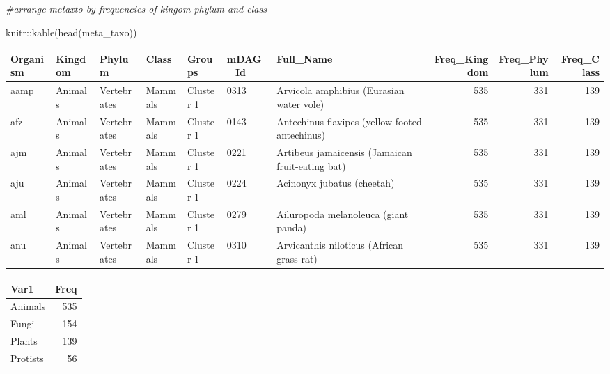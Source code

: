 \documentclass[
  letterpaper,
  DIV=11,
  numbers=noendperiod]{scrreprt}
\newenvironment{Shaded}{}{}
\newcommand{\AttributeTok}[1]{\textcolor[rgb]{0.78,0.47,0.87}{#1}}
\newcommand{\CommentTok}[1]{\textcolor[rgb]{0.36,0.39,0.44}{\textit{#1}}}
\newcommand{\FunctionTok}[1]{\textcolor[rgb]{0.38,0.69,0.94}{#1}}
\newcommand{\NormalTok}[1]{\textcolor[rgb]{0.67,0.70,0.75}{#1}}
\newcommand{\SpecialCharTok}[1]{\textcolor[rgb]{0.34,0.71,0.76}{#1}}
\newcommand{\StringTok}[1]{\textcolor[rgb]{0.60,0.76,0.47}{#1}}
\begin{document}
\begin{Shaded}
\begin{Highlighting}[]
\CommentTok{\#arrange metaxto by frequencies of kingom phylum and class}


\NormalTok{knitr}\SpecialCharTok{::}\FunctionTok{kable}\NormalTok{(}\FunctionTok{head}\NormalTok{(meta\_taxo))}
\end{Highlighting}
\end{Shaded}

\begin{tabular}{l|l|l|l|l|l|l|r|r|r}
\hline
Organism & Kingdom & Phylum & Class & Groups & mDAG\_Id & Full\_Name & Freq\_Kingdom & Freq\_Phylum & Freq\_Class\\
\hline
aamp & Animals & Vertebrates & Mammals & Cluster 1 & 0313 & Arvicola amphibius (Eurasian water vole) & 535 & 331 & 139\\
\hline
afz & Animals & Vertebrates & Mammals & Cluster 1 & 0143 & Antechinus flavipes (yellow-footed antechinus) & 535 & 331 & 139\\
\hline
ajm & Animals & Vertebrates & Mammals & Cluster 1 & 0221 & Artibeus jamaicensis (Jamaican fruit-eating bat) & 535 & 331 & 139\\
\hline
aju & Animals & Vertebrates & Mammals & Cluster 1 & 0224 & Acinonyx jubatus (cheetah) & 535 & 331 & 139\\
\hline
aml & Animals & Vertebrates & Mammals & Cluster 1 & 0279 & Ailuropoda melanoleuca (giant panda) & 535 & 331 & 139\\
\hline
anu & Animals & Vertebrates & Mammals & Cluster 1 & 0310 & Arvicanthis niloticus (African grass rat) & 535 & 331 & 139\\
\hline
\end{tabular}

\begin{Shaded}
\end{Shaded}

\begin{tabular}{l|r}
\hline
Var1 & Freq\\
\hline
Animals & 535\\
\hline
Fungi & 154\\
\hline
Plants & 139\\
\hline
Protists & 56\\
\hline
\end{tabular}
\end{document}
